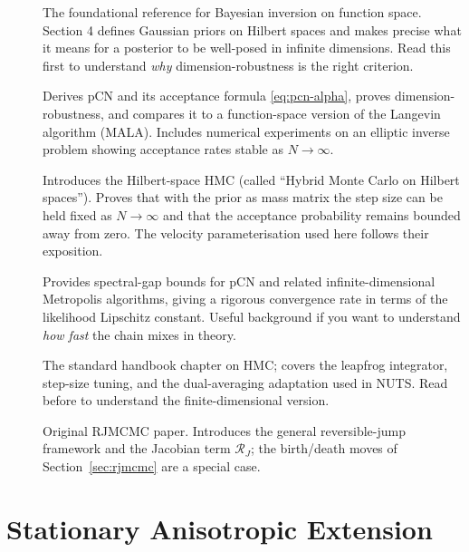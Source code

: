 \documentclass[11pt]{article}
\begin{document}
\begin{description}
  \item[\citet{stuart2010}] The foundational reference for Bayesian inversion on
    function space.  Section 4 defines Gaussian priors on Hilbert spaces and makes
    precise what it means for a posterior to be well-posed in infinite dimensions.
    Read this first to understand \emph{why} dimension-robustness is the right
    criterion.

  \item[\citet{cotter2013}] Derives pCN and its acceptance formula \eqref{eq:pcn-alpha},
    proves dimension-robustness, and compares it to a function-space version of
    the Langevin algorithm (MALA).  Includes numerical experiments on an elliptic
    inverse problem showing acceptance rates stable as $N \to \infty$.

  \item[\citet{beskos2011}] Introduces the Hilbert-space HMC (called ``Hybrid Monte
    Carlo on Hilbert spaces'').  Proves that with the prior as mass matrix the
    step size can be held fixed as $N \to \infty$ and that the acceptance
    probability remains bounded away from zero.  The velocity parameterisation
    used here follows their exposition.

  \item[\citet{hairer2014}] Provides spectral-gap bounds for pCN and related
    infinite-dimensional Metropolis algorithms, giving a rigorous convergence rate
    in terms of the likelihood Lipschitz constant.  Useful background if you want
    to understand \emph{how fast} the chain mixes in theory.

  \item[\citet{neal2011}] The standard handbook chapter on HMC; covers the
    leapfrog integrator, step-size tuning, and the dual-averaging adaptation used
    in NUTS.  Read before \citet{beskos2011} to understand the finite-dimensional
    version.

  \item[\citet{green1995}] Original RJMCMC paper.  Introduces the general
    reversible-jump framework and the Jacobian term $\mathcal{R}_J$; the birth/death
    moves of Section~\ref{sec:rjmcmc} are a special case.
\end{description}

\section{Stationary Anisotropic Extension}
\label{sec:anisotropic}
\end{document}
